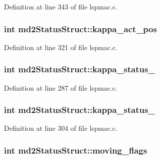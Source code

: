 Definition at line 343 of file lspmac.\-c.

\hypertarget{structmd2StatusStruct_ac384fb7073387dd5dcb2e85a00ec8a77}{
\subsubsection[{kappa\-\_\-act\-\_\-pos}]{\setlength{\rightskip}{0pt plus 5cm}int md2\-Status\-Struct\-::kappa\-\_\-act\-\_\-pos}}\label{structmd2StatusStruct_ac384fb7073387dd5dcb2e85a00ec8a77}


Definition at line 321 of file lspmac.\-c.

\hypertarget{structmd2StatusStruct_ab152694bc32d37c1d180f55e8d282020}{
\subsubsection[{kappa\-\_\-status\-\_\-1}]{\setlength{\rightskip}{0pt plus 5cm}int md2\-Status\-Struct\-::kappa\-\_\-status\-\_}}\label{structmd2StatusStruct_ab152694bc32d37c1d180f55e8d282020}


Definition at line 287 of file lspmac.\-c.

\hypertarget{structmd2StatusStruct_af6891f5f8dcfc62668f64c583042c6bc}{
\subsubsection[{kappa\-\_\-status\-\_\-2}]{\setlength{\rightskip}{0pt plus 5cm}int md2\-Status\-Struct\-::kappa\-\_\-status\-\_}}\label{structmd2StatusStruct_af6891f5f8dcfc62668f64c583042c6bc}


Definition at line 304 of file lspmac.\-c.

\hypertarget{structmd2StatusStruct_aac82f8e97fa39ea9be7823dd1d308986}{
\subsubsection[{moving\-\_\-flags}]{\setlength{\rightskip}{0pt plus 5cm}int md2\-Status\-Struct\-::moving\-\_\-flags}}\label{structmd2StatusStruct_aac82f8e97fa39ea9be7823dd1d308986}


